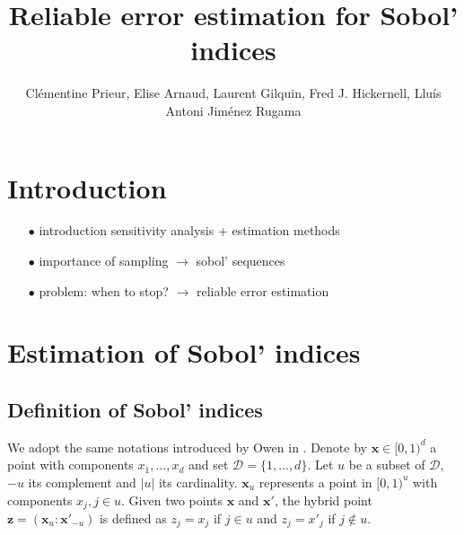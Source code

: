 \documentclass[]{elsarticle}
\theoremstyle{definition}
\newcommand{\bvec}[1]{\boldsymbol{#1}}
\newcommand{\vx}{\bvec{x}}
\newcommand{\vz}{\bvec{z}}
\begin{document}
\begin{frontmatter}

\title{Reliable error estimation for Sobol' indices}

\author{Cl\'ementine Prieur, Elise Arnaud, Laurent Gilquin, Fred J. Hickernell, Llu\'{i}s Antoni Jim\'{e}nez Rugama}
\address{U. Josef Fourier, Illinois Institute of Technology}
\begin{abstract}
\end{abstract}

\end{frontmatter}

\section{Introduction}

\begin{itemize}
\item[$\bullet$] introduction sensitivity analysis + estimation methods
\item[$\bullet$] importance of sampling $\rightarrow$ sobol' sequences
\item[$\bullet$] problem: when to stop? $\rightarrow$ reliable error estimation 
\end{itemize}

\section{Estimation of Sobol' indices}
\subsection{Definition of Sobol' indices}
We adopt the same notations introduced by Owen in \cite{Owen}. Denote by $\vx \in [0,1)^d$ a point with components $x_1,\dots,x_d$ and set $\mathcal{D}=\{1,\dots,d\}$. Let $u$ be a subset of $\mathcal{D}$, $-u$ its complement and $|u|$ its cardinality. $\vx_u$ represents a point in $[0,1)^u$ with components $x_j, j \in u$. Given two points $\vx$ and $\vx'$, the hybrid point $\vz=(\vx_u:{\vx'}_{-u})$ is defined as $z_j=x_j$ if $j \in u$ and $z_j={x'}_j$ if $j \notin u$.
\end{document}
